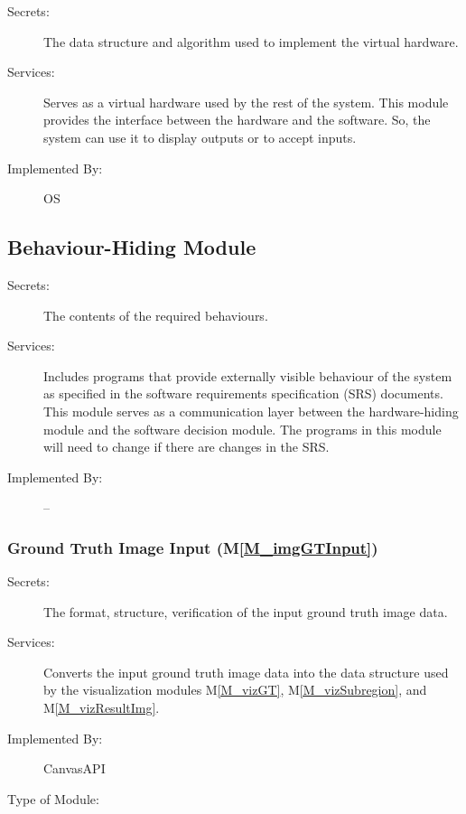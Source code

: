 \documentclass[12pt, titlepage]{article}
\newcommand{\mref}[1]{M\ref{#1}}
\begin{document}
\begin{description}
\item[Secrets:]The data structure and algorithm used to implement the virtual
  hardware.
\item[Services:]Serves as a virtual hardware used by the rest of the
  system. This module provides the interface between the hardware and the
  software. So, the system can use it to display outputs or to accept inputs.
\item[Implemented By:] OS
\end{description}

\subsection{Behaviour-Hiding Module}

\begin{description}
\item[Secrets:]The contents of the required behaviours.
\item[Services:]Includes programs that provide externally visible behaviour of
  the system as specified in the software requirements specification (SRS)
  documents. This module serves as a communication layer between the
  hardware-hiding module and the software decision module. The programs in this
  module will need to change if there are changes in the SRS.
\item[Implemented By:] --
\end{description}


\subsubsection{Ground Truth Image Input (\mref{M_imgGTInput})}
\begin{description}
\item[Secrets:]The format, structure, verification of the input ground truth image data.
\item[Services:]Converts the input ground truth image data into the data structure used by the
  visualization modules \mref{M_vizGT}, \mref{M_vizSubregion}, and \mref{M_vizResultImg}.
\item[Implemented By:] CanvasAPI
\item[Type of Module:] 
\end{description}
\end{document}
